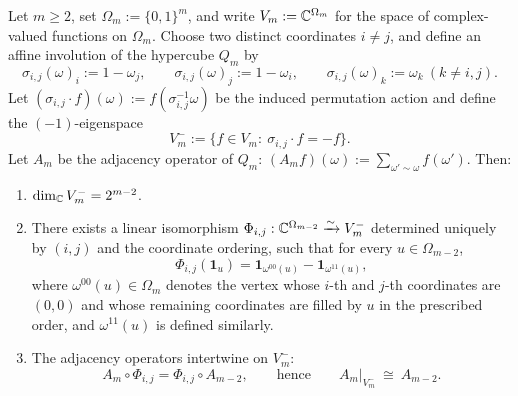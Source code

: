 \begin{theorem}\label{thm:window6-chiral-compression-hypercube-adjacency}
Let \(m\ge 2\), set \(\Omega_m:=\{0,1\}^m\), and write \(V_m:=\mathbb{C}^{\Omega_m}\) for the space of complex-valued functions on \(\Omega_m\).
Choose two distinct coordinates \(i\neq j\), and define an affine involution of the hypercube \(Q_m\) by
\[
\sigma_{i,j}(\omega)_i:=1-\omega_j,\qquad
\sigma_{i,j}(\omega)_j:=1-\omega_i,\qquad
\sigma_{i,j}(\omega)_k:=\omega_k\ (k\ne i,j).
\]
Let \((\sigma_{i,j}\cdot f)(\omega):=f(\sigma_{i,j}^{-1}\omega)\) be the induced permutation action and define the \((-1)\)-eigenspace
\[
V_m^-:=\{f\in V_m:\ \sigma_{i,j}\cdot f=-f\}.
\]
Let \(A_m\) be the adjacency operator of \(Q_m\):
\(
(A_m f)(\omega):=\sum_{\omega'\sim\omega}f(\omega')
\).
Then:
\begin{enumerate}
  \item \(\dim_{\mathbb{C}}V_m^-=2^{m-2}\).
  \item There exists a linear isomorphism
  \(
  \Phi_{i,j}:\mathbb{C}^{\Omega_{m-2}}\xrightarrow{\sim}V_m^-
  \)
  determined uniquely by \((i,j)\) and the coordinate ordering, such that for every \(u\in\Omega_{m-2}\),
  \[
  \Phi_{i,j}(\mathbf 1_u)=\mathbf 1_{\omega^{00}(u)}-\mathbf 1_{\omega^{11}(u)},
  \]
  where \(\omega^{00}(u)\in\Omega_m\) denotes the vertex whose \(i\)-th and \(j\)-th coordinates are \((0,0)\) and whose remaining coordinates are filled by \(u\) in the prescribed order, and \(\omega^{11}(u)\) is defined similarly.
  \item The adjacency operators intertwine on \(V_m^-\):
  \[
  A_m\circ \Phi_{i,j}=\Phi_{i,j}\circ A_{m-2},
  \qquad\text{hence}\qquad
  A_m|_{V_m^-}\ \cong\ A_{m-2}.
  \]
\end{enumerate}
\end{theorem}

